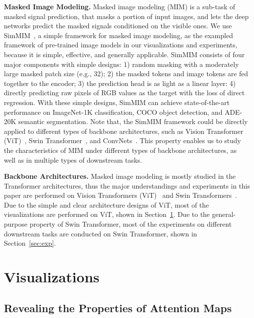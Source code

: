\documentclass{article}
\begin{document}
\noindent\textbf{Masked Image Modeling.}
Masked image modeling (MIM) is a sub-task of masked signal prediction, that masks a portion of input images, and lets the deep networks predict the masked signals conditioned on the visible ones.
We use SimMIM~\cite{xie2021simmim}, a simple framework for masked image modeling, as the exampled framework of pre-trained image models in our visualizations and experiments, because it is simple, effective, and generally applicable. 
SimMIM consists of four major components with simple designs: 1) random masking with a moderately large masked patch size (e.g., 32); 2) the masked tokens and image tokens are fed together to the encoder; 3) the prediction head is as light as a linear layer: 4) directly predicting raw pixels of RGB values as the target with the  loss of direct regression. 
With these simple designs, SimMIM can achieve state-of-the-art performance on ImageNet-1K classification, COCO object detection, and ADE-20K semantic segmentation.
Note that, the SimMIM framework could be directly applied to different types of backbone architectures, such as Vision Transformer (ViT)~\cite{dosovitskiy2020vit}, Swin Transformer~\cite{liu2021swin}, and ConvNets~\cite{he2016resnet,replknet}. This property enables us to study the characteristics of MIM under different types of backbone architectures, as well as in multiple types of downstream tasks.


\noindent\textbf{Backbone Architectures.} Masked image modeling is mostly studied in the Transformer architectures, thus the major understandings and experiments in this paper are performed on Vision Transformers (ViT)~\cite{dosovitskiy2020vit} and Swin Transformers~\cite{liu2021swin,swinv2}. Due to the simple and clear architecture designs of ViT, most of the visualizations are performed on ViT, shown in Section~\ref{sec:vis}. Due to the general-purpose property of Swin Transformer, most of the experiments on different downstream tasks are conducted on Swin Transformer, shown in Section~\ref{sec:exp}. 





\section{Visualizations}\label{sec:vis}

\subsection{Revealing the Properties of Attention Maps}
\end{document}
